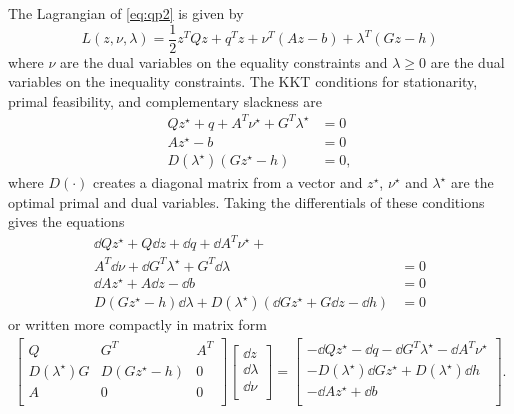The Lagrangian of \eqref{eq:qp2} is given by
\begin{equation}
    L(z,\nu,\lambda)=\frac{1}{2}z^TQz+q^Tz+\nu^T(Az-b)+\lambda^T(Gz-h)
\end{equation}
where $\nu$ are the dual variables on the equality constraints
and $\lambda\geq 0$ are the dual variables on the inequality constraints.
The KKT conditions for stationarity, primal feasibility,
and complementary slackness are
\begin{equation}
    \begin{split}
        Qz^\star+q+A^T\nu^\star+G^T\lambda^\star &= 0 \\
        Az^\star-b &= 0 \\
        D(\lambda^\star)(Gz^\star-h) &= 0,
    \end{split}
\end{equation}
where $D(\cdot)$ creates a diagonal matrix from a vector
and $z^\star$, $\nu^\star$ and $\lambda^\star$ are the optimal
primal and dual variables.
Taking the differentials of these conditions gives the equations
\begin{equation}
    \begin{split}
        \dd Qz^\star + Q \dd z + \dd q + \dd A^T \nu^\star + & \\
        A^T \dd \nu + \dd G^T
        \lambda^\star + G^T \dd \lambda & = 0 \\
        \dd A z^\star + A \dd z - \dd b & = 0 \\
        D(Gz^\star -h)\dd \lambda + D(\lambda^\star)(\dd G z^\star  + G \dd z  - \dd h)
        & = 0
    \end{split}
\end{equation}
or written more compactly in matrix form
\begin{equation}
    \begin{split}
        \begin{bmatrix}
            Q                 & G^T           & A^T \\
            D(\lambda^\star)G & D(Gz^\star-h) & 0   \\
            A                 & 0             & 0   \\
        \end{bmatrix}
        \begin{bmatrix}
            \dd z       \\
            \dd \lambda \\
            \dd \nu     \\
        \end{bmatrix} =
        \begin{bmatrix}
            -\dd Qz^\star - \dd q - \dd G^T\lambda^\star - \dd A^T\nu^\star \\
            -D(\lambda^\star)\dd Gz^\star + D(\lambda^\star)\dd h           \\
            -\dd Az^\star + \dd b                                           \\
        \end{bmatrix}.
    \end{split}
    \label{eq:kkt-diff}
\end{equation}
